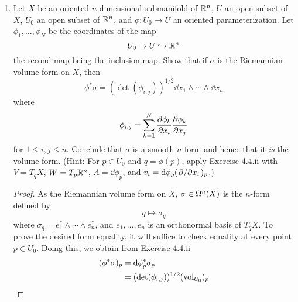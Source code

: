 \documentclass[../psets.tex]{subfiles}
\begin{document}
\begin{enumerate}[label={\textbf{4.4.\roman*.}}]
\begin{proof}
        We have that
        \begin{align*}
            A^*\vol_V &= A^*(e_1^*\wedge\cdots\wedge e_n^*)\\
            &= \det(a_{i,j})(f_1^*\wedge\cdots\wedge f_n^*)\tag*{Equation 1.8.10}\\
            &= \det(a_{i,j})\vol_W\\
            &= \left( \det(b_{i,j}) \right)^{1/2}\vol_W\tag*{Exercise 4.4.i}
        \end{align*}
        as desired.
    \end{proof}
    \item Let $X$ be an oriented $n$-dimensional submanifold of $\R^n$, $U$ an open subset of $X$, $U_0$ an open subset of $\R^n$, and $\phi:U_0\to U$ an oriented parameterization. Let $\phi_1,\dots,\phi_N$ be the coordinates of the map
    \begin{equation*}
        U_0 \to U \hookrightarrow \R^n
    \end{equation*}
    the second map being the inclusion map. Show that if $\sigma$ is the Riemannian volume form on $X$, then
    \begin{equation*}
        \phi^*\sigma = \left( \det(\phi_{i,j}) \right)^{1/2}\dd{x_1}\wedge\cdots\wedge\dd{x_n}
    \end{equation*}
    where
    \begin{equation*}
        \phi_{i,j} = \sum_{k=1}^N\pdv{\phi_k}{x_i}\pdv{\phi_k}{x_j}
    \end{equation*}
    for $1\leq i,j\leq n$. Conclude that $\sigma$ is a smooth $n$-form and hence that it \emph{is} the volume form. (Hint: For $p\in U_0$ and $q=\phi(p)$, apply Exercise 4.4.ii with $V=T_qX$, $W=T_p\R^n$, $A=\dd\phi_p$, and $v_i=\dd\phi_p(\pdv*{x_i})_p$.)
    \begin{proof}
        As the Riemannian volume form on $X$, $\sigma\in\ome[n]{X}$ is the $n$-form defined by
        \begin{equation*}
            q \mapsto \sigma_q
        \end{equation*}
        where $\sigma_q=e_1^*\wedge\cdots\wedge e_n^*$, and $e_1,\dots,e_n$ is an orthonormal basis of $T_qX$. To prove the desired form equality, it will suffice to check equality at every point $p\in U_0$. Doing this, we obtain from Exercise 4.4.ii
        \begin{align*}
            (\phi^*\sigma)_p &= \dd\phi_p^*\sigma_p\\
            &= (\det(\phi_{i,j}))^{1/2}(\vol_{U_0})_p
        \end{align*}

\end{proof}
\end{enumerate}
\end{document}
